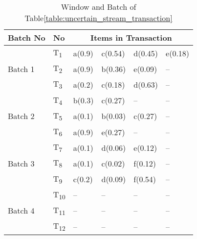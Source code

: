 \documentclass{article}
\begin{document}
\begin{table}
\centering

\begin{tabular}{|l|l|l|l|l|l|}
\hline
	Batch No& No & \multicolumn{4}{c|}{Items in Transaction} \\ \hline \hline
	\multirow{3}{*}{Batch 1}	&	T\textsubscript{1} & a(0.9) & c(0.54) & d(0.45) & e(0.18)			\\\cline{2-6}
								&	T\textsubscript{2} & a(0.9) & b(0.36) & e(0.09) & --			\\\cline{2-6}
								&	T\textsubscript{3} & a(0.2) & c(0.18) & d(0.63) & --			\\\hline
	\multirow{3}{*}{Batch 2}	&	T\textsubscript{4} & b(0.3) & c(0.27) & 	--     & --	\\\cline{2-6}
								&	T\textsubscript{5} & a(0.1) & b(0.03) & c(0.27) & --  			\\\cline{2-6}
								&	T\textsubscript{6} & a(0.9) & e(0.27) & --	   & --  			\\\hline
	\multirow{3}{*}{Batch 3}	&	T\textsubscript{7} & a(0.1) & d(0.06) & e(0.12) & --	\\\cline{2-6}
								&	T\textsubscript{8} & a(0.1) & c(0.02) & f(0.12) & --   			\\\cline{2-6}
								&	T\textsubscript{9} & c(0.2) & d(0.09) & f(0.54) & --   			\\\hline
								
	\multirow{3}{*}{Batch 4}	&	T\textsubscript{10} &  --  &  --  &  --  & --    				\\\cline{2-6}
								&	T\textsubscript{11} &  --  &  --  &  --  & --    				\\\cline{2-6}
								&	T\textsubscript{12} &  --  &  --  &  --  & --    				\\\hline
	\end{tabular}
\caption{Window and Batch of Table\ref{table:uncertain_stream_transaction}}
\label{table:prefix_assigned}
\end{table}
\end{document}

